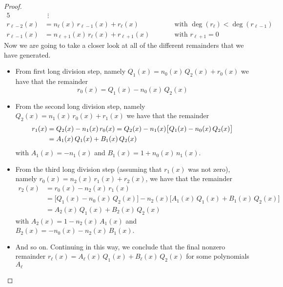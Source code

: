 \begin{proof}
\begin{alignat*}{5}
&\ \ \vdots \\
r_{\ell-2}(x)&=n_\ell(x)\,r_{\ell-1}(x)+r_\ell(x)\qquad 
            &&\text{with $\deg(r_\ell)<\deg(r_{\ell-1})$} \\
r_{\ell-1}(x)&=n_{\ell+1}(x)\,r_\ell(x)+r_{\ell+1}(x)\qquad 
            &&\text{with $r_{\ell+1}=0$}
\end{alignat*}
Now we are going to take a closer look at all of the different remainders that we have generated.
\begin{itemize}\itemsep1pt \parskip0pt  %
\item
From first long division step, namely 
$Q_1(x) = n_0(x)\,Q_2(x) + r_0(x)
$
we have that the remainder
\begin{equation*}
r_0(x)=Q_1(x)-n_0(x)\,Q_2(x)
\end{equation*}
\item
From the second long division step, namely
$Q_2(x) = n_1(x)\,r_0(x) + r_1(x)$
we have that the remainder
\begin{align*}
& r_1(x)=Q_2(x)-n_1(x)\,r_0(x)
        = Q_2(x)-n_1(x)\big[Q_1(x)-n_0(x)\,Q_2(x)\big]\\
      &\phantom{r_1(x)}
          =A_1(x)\,Q_1(x)+B_1(x)\,Q_2(x)\hidewidth
\end{align*}
with $A_1(x) =-n_1(x)$ and $B_1(x) = 1+n_0(x)\,n_1(x)$. 
\item
From the third long division step (assuming that $r_1(x)$ was not zero),
namely $r_0(x)=n_2(x)\,r_1(x)+r_2(x)$, we have that the remainder
\begin{align*}
r_2(x)&=r_0(x)-n_2(x)\,r_1(x) \\
&=\big[Q_1(x)-n_0(x)\,Q_2(x)\big]
             -n_2(x)\big[A_1(x)\,Q_1(x)+B_1(x)\,Q_2(x)\big]\\
      &=A_2(x)\,Q_1(x)+B_2(x)\,Q_2(x) 
\end{align*}
with $A_2(x)= 1-n_2(x)\,A_1(x)$ and $B_2(x) = -n_0(x)-n_2(x)\,B_1(x)$.
\item
And so on. Continuing in this way, we conclude that the final nonzero remainder
$r_\ell(x)=A_\ell(x)\,Q_1(x)+B_\ell(x)\,Q_2(x)$ for some polynomials $A_\ell$

\end{itemize}
\end{proof}
